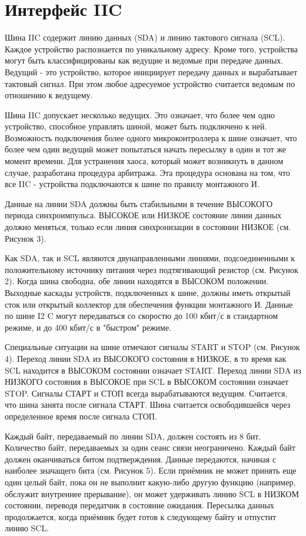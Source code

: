 \documentclass[a4paper,oneside ,14pt]{extreport}
\begin{document}
\section{Интерфейс IIC}

Шина IIC содержит линию данных (SDA) и линию тактового сигнала (SCL). 
Каждое устройство распознается по уникальному адресу.
Кроме того, устройства могут быть классифицированы как ведущие и ведомые при передаче данных.
Ведущий - это устройство, которое инициирует передачу данных и
вырабатывает тактовый сигнал. При этом любое адресуемое устройство считается
ведомым по отношению к ведущему. 

Шина IIC допускает несколько ведущих. Это означает, что более чем одно устройство, 
способное управлять шиной, может быть подключено к ней.
Возможность подключения более одного микроконтроллера к шине означает, что более
чем один ведущий может попытаться начать пересылку в один и тот же момент времени. 
Для устранения хаоса, который может возникнуть в данном случае, разработана
процедура арбитража. Эта процедура основана на том, что все IIC - устройства подключаются к шине по правилу монтажного И.

Данные на линии SDA должны быть стабильными в течение ВЫСОКОГО периода
синхроимпульса. ВЫСОКОЕ или НИЗКОЕ состояние линии данных должно меняться, 
только если линия синхронизации в состоянии НИЗКОЕ (см. Рисунок 3). 

Как SDA, так и SCL являются двунаправленными линиями, подсоединенными к
положительному источнику питания через подтягивающий резистор (см. Рисунок 2). 
Когда шина свободна, обе линии находятся в ВЫСОКОМ положении. Выходные каскады
устройств, подключенных к шине, должны иметь открытый сток или открытый коллектор
для обеспечения функции монтажного И. Данные по шине I2
C могут передаваться со скоростю до 100 кбит/с в стандартном режиме, и до 400 кбит/с в "быстром" режиме. 

Специальные ситуации на шине отмечают сигналы START и STOP (см. Рисунок 4). 
Переход линии SDA из ВЫСОКОГО состояния в НИЗКОЕ, в то время как SCL находится
в ВЫСОКОМ состоянии означает START. 
Переход линии SDA из НИЗКОГО состояния в ВЫСОКОЕ при SCL в ВЫСОКОМ
состоянии означает STOP. 
Сигналы СТАРТ и СТОП всегда вырабатываются ведущим. Считается, что шина занята
после сигнала СТАРТ. Шина считается освободившейся через определенное время после
сигнала СТОП. 

Каждый байт, передаваемый по линии SDA, должен состоять из 8 бит. Количество байт, передаваемых за один сеанс связи неограничено. Каждый байт должен оканчиваться битом подтверждения. Данные передаются, начиная с наиболее значащего бита (см. Рисунок 5). Если приёмник не может принять еще один целый байт, пока он не выполнит какую-либо другую функцию (например, обслужит внутреннее прерывание), он может удерживать линию SCL в НИЗКОМ состоянии, переводя передатчик в состояние ожидания. Пересылка данных продолжается, когда приёмник будет готов к следующему байту и отпустит линию SCL.
\end{document}
